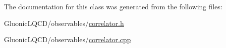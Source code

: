 The documentation for this class was generated from the following files\+:\begin{DoxyCompactItemize}
\item 
Gluonic\+L\+Q\+C\+D/observables/\mbox{\hyperlink{correlator_8h}{correlator.\+h}}\item 
Gluonic\+L\+Q\+C\+D/observables/\mbox{\hyperlink{correlator_8cpp}{correlator.\+cpp}}\end{DoxyCompactItemize}
